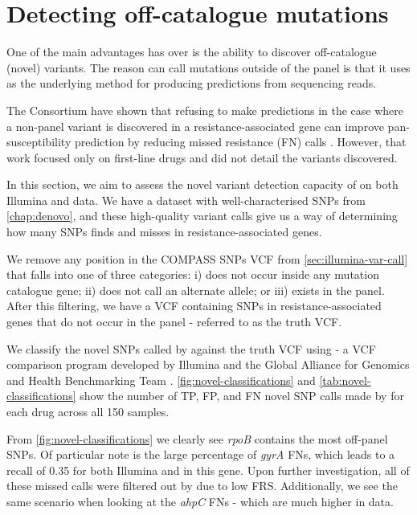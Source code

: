\section{Detecting off-catalogue mutations}
\label{sec:drprg-discover}

One of the main advantages \drprg{} has over \mykrobe{} is the ability to discover off-catalogue (novel) variants. The reason \drprg{} can call mutations outside of the panel is that it uses \pandora{} as the underlying method for producing predictions from sequencing reads.

The \cryptic{} Consortium have shown that refusing to make predictions in the case where a non-panel variant is discovered in a resistance-associated gene can improve pan-susceptibility prediction by reducing missed resistance (FN) calls \cite{cryptic2018}. However, that work focused only on first-line drugs and did not detail the variants discovered. 

In this section, we aim to assess the novel variant detection capacity of \drprg{} on both Illumina and \ont{} data. We have a dataset with well-characterised SNPs from \autoref{chap:denovo}, and these high-quality variant calls give us a way of determining how many SNPs \drprg{} finds and misses in resistance-associated genes. 

We remove any position in the COMPASS SNPs VCF from \autoref{sec:illumina-var-call} that falls into one of three categories: i) does not occur inside any mutation catalogue gene; ii) does not call an alternate allele; or iii) exists in the panel. After this filtering, we have a VCF containing SNPs in resistance-associated genes that do not occur in the panel - referred to as the truth VCF.

We classify the novel SNPs called by \drprg{} against the truth VCF using  - a VCF comparison program developed by Illumina and the Global Alliance for Genomics and Health Benchmarking Team \cite{happy2019}. \autoref{fig:novel-classifications} and \autoref{tab:novel-classifications} show the number of TP, FP, and FN novel SNP calls made by \drprg{} for each drug across all 150 samples. 

From \autoref{fig:novel-classifications} we clearly see \textit{rpoB} contains the most off-panel SNPs. Of particular note is the large percentage of \textit{gyrA} FNs, which leads to a recall of 0.35 for both Illumina and \ont{} in this gene. Upon further investigation, all of these missed calls were filtered out by \drprg{} due to low FRS. Additionally, we see the same scenario when looking at the \textit{ahpC} FNs - which are much higher in \ont{} data. 


